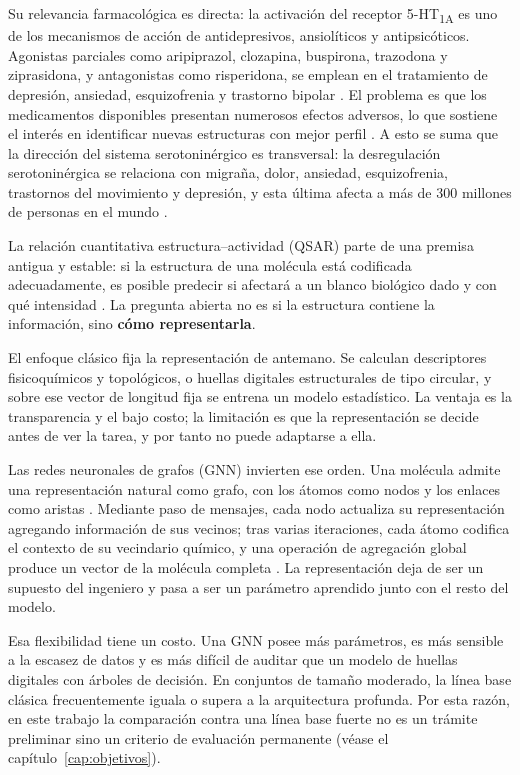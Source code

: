 Su relevancia farmacológica es directa: la activación del receptor
5-HT\textsubscript{1A} es uno de los mecanismos de acción de antidepresivos,
ansiolíticos y antipsicóticos. Agonistas parciales como aripiprazol, clozapina,
buspirona, trazodona y ziprasidona, y antagonistas como risperidona, se emplean
en el tratamiento de depresión, ansiedad, esquizofrenia y trastorno bipolar
\cite{czub_automlbased_2022}. El problema es que los medicamentos disponibles presentan
numerosos efectos adversos, lo que sostiene el interés en identificar nuevas
estructuras con mejor perfil \cite{czub_automlbased_2022}. A esto se suma que la
dirección del sistema serotoninérgico es transversal: la desregulación
serotoninérgica se relaciona con migraña, dolor, ansiedad, esquizofrenia,
trastornos del movimiento y depresión, y esta última afecta a más de 300
millones de personas en el mundo \cite{czub_curated_2021}. 
 

 
La relación cuantitativa estructura--actividad (QSAR) parte de una premisa
antigua y estable: si la estructura de una molécula está codificada
adecuadamente, es posible predecir si afectará a un blanco biológico dado y con
qué intensidad \cite{czub_automlbased_2022}. La pregunta abierta no es si la estructura
contiene la información, sino \textbf{cómo representarla}.
 
El enfoque clásico fija la representación de antemano. Se calculan descriptores
fisicoquímicos y topológicos, o huellas digitales estructurales de tipo
circular, y sobre ese vector de longitud fija se entrena un modelo estadístico.
La ventaja es la transparencia y el bajo costo; la limitación es que la
representación se decide antes de ver la tarea, y por tanto no puede adaptarse a
ella.
 
Las redes neuronales de grafos (GNN) invierten ese orden. Una molécula admite una
representación natural como grafo, con los átomos como nodos y los enlaces como
aristas \cite{mao_artificial_2026}. Mediante paso de mensajes, cada nodo actualiza su
representación agregando información de sus vecinos; tras varias iteraciones,
cada átomo codifica el contexto de su vecindario químico, y una operación de
agregación global produce un vector de la molécula completa
\cite{zhang_ssgnn_2023}. La representación deja de ser un supuesto del ingeniero y
pasa a ser un parámetro aprendido junto con el resto del modelo.
 
Esa flexibilidad tiene un costo. Una GNN posee más parámetros, es más sensible a
la escasez de datos y es más difícil de auditar que un modelo de huellas
digitales con árboles de decisión. En conjuntos de tamaño moderado, la línea base
clásica frecuentemente iguala o supera a la arquitectura profunda. Por esta
razón, en este trabajo la comparación contra una línea base fuerte no es un
trámite preliminar sino un criterio de evaluación permanente
(véase el capítulo~\ref{cap:objetivos}).
 
